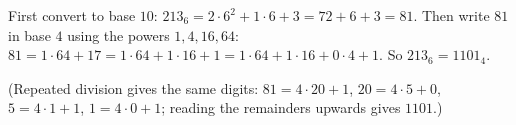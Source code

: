 First convert to base $10$: $213_6=2\cdot6^2+1\cdot6+3=72+6+3=81$. Then write $81$ in base $4$ using the powers $1,4,16,64$: $81=1\cdot64+17=1\cdot64+1\cdot16+1=1\cdot64+1\cdot16+0\cdot4+1$. So $213_6=\boxed{1101_4}$.

(Repeated division gives the same digits: $81=4\cdot20+1$, $20=4\cdot5+0$, $5=4\cdot1+1$, $1=4\cdot0+1$; reading the remainders upwards gives $1101$.)
